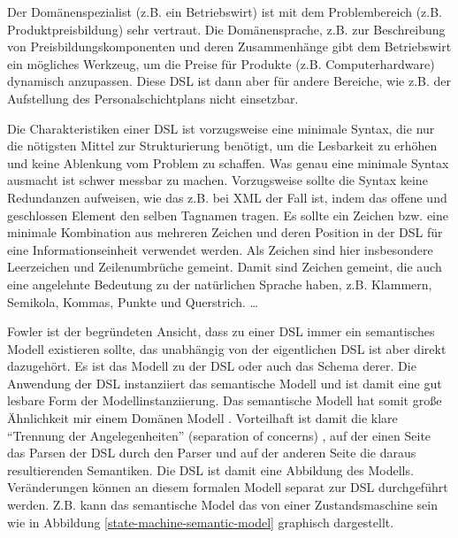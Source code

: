 \documentclass[11pt,english,ngerman, headsepline]{scrreprt}
\begin{document}
Der Domänenspezialist (z.B. ein Betriebswirt) ist mit dem Problembereich (z.B.
Produktpreisbildung) sehr vertraut. Die Domänensprache, z.B. zur Beschreibung
von Preisbildungskomponenten und deren Zusammenhänge gibt dem Betriebswirt ein
mögliches Werkzeug, um die Preise für Produkte (z.B. Computerhardware) dynamisch
anzupassen. Diese DSL ist dann aber für andere Bereiche, wie z.B.
der Aufstellung des Personalschichtplans nicht einsetzbar.

Die Charakteristiken einer DSL ist vorzugsweise eine minimale Syntax, die nur
die nötigsten Mittel zur Strukturierung benötigt, um die Lesbarkeit zu erhöhen
und keine Ablenkung vom Problem zu schaffen. 
Was genau eine minimale Syntax ausmacht ist schwer messbar zu machen.
Vorzugsweise sollte die Syntax keine Redundanzen aufweisen, wie das z.B. bei
XML der Fall ist, indem das offene und geschlossen Element den selben
Tagnamen tragen. Es sollte ein Zeichen bzw. eine minimale
Kombination aus mehreren Zeichen und deren Position in der DSL für eine Informationseinheit
verwendet werden. Als Zeichen sind hier insbesondere Leerzeichen und
Zeilenumbrüche gemeint. Damit sind Zeichen gemeint, die auch eine angelehnte
Bedeutung zu der natürlichen Sprache haben, z.B. Klammern, Semikola, Kommas,
Punkte und Querstrich. \ldots

Fowler ist der begründeten Ansicht, dass zu einer DSL immer ein semantisches
Modell \cite[p. 159]{fowler2011domain} existieren sollte, das unabhängig von
der eigentlichen DSL ist aber direkt dazugehört. Es ist das Modell zu der DSL 
oder auch das Schema derer. Die Anwendung der DSL instanziiert das semantische
Modell und ist damit eine gut lesbare Form der Modellinstanziierung. Das semantische Modell hat somit
große Ähnlichkeit mir einem Domänen Modell \cite[]{fowler2003patterns}.
Vorteilhaft ist damit die klare ``Trennung der Angelegenheiten'' (separation of
concerns) \cite{Huersch95separationof}, auf der einen Seite das Parsen der DSL
durch den Parser und auf der anderen Seite die daraus resultierenden Semantiken.
Die DSL ist damit eine Abbildung des Modells. Veränderungen können an diesem
formalen Modell separat zur DSL durchgeführt werden. Z.B. kann das semantische
Model das von einer Zustandsmaschine sein wie in Abbildung
\ref{state-machine-semantic-model} graphisch dargestellt.
\end{document}
